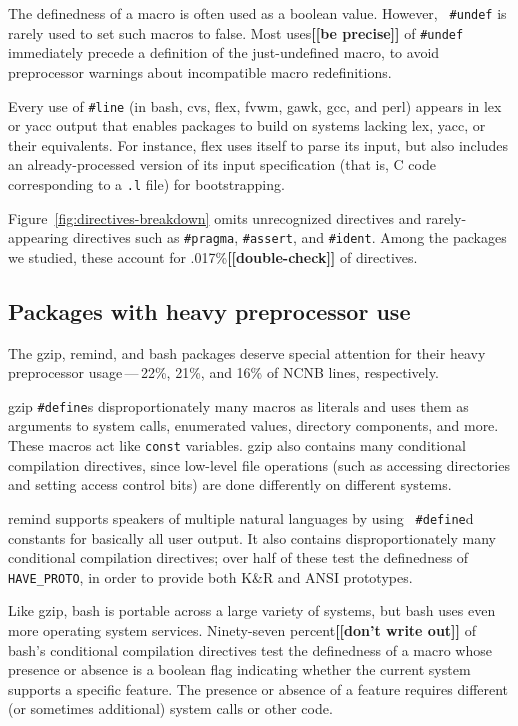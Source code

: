 \documentclass[10pt]{article}
\newcommand{\comment}[1]{\textbf{[[#1]]}}
\newcommand{\pkg}[1]{\textsf{#1}}
\begin{document}
The definedness of a macro is often used as a boolean value.  However, {\tt
\#undef} is rarely used to set such macros to false.  Most
uses\comment{be precise} of {\tt \#undef} immediately precede a definition
of the just-undefined macro, to avoid preprocessor warnings about
incompatible macro redefinitions.

Every use of {\tt \#line} (in \pkg{bash}, \pkg{cvs}, \pkg{flex}, \pkg{fvwm},
\pkg{gawk}, \pkg{gcc}, and \pkg{perl}) appears in lex or yacc
output that enables packages to build on systems lacking lex, yacc, or
their equivalents.  For instance, \pkg{flex} uses itself to parse its
input, but also includes an already-processed version of its input
specification (that is, C code corresponding to a {\tt .l} file) for
bootstrapping.


Figure~\ref{fig:directives-breakdown} omits unrecognized directives and
rarely-appearing directives such as {\tt \#pragma}, {\tt \#assert}, and
{\tt \#ident}.  Among the packages we studied, these account for
.017\%\comment{double-check} of directives.


\subsection{Packages with heavy preprocessor use}

The \pkg{gzip}, \pkg{remind}, and \pkg{bash} packages deserve
special attention for their heavy preprocessor usage\,---\,22\%, 21\%, and
16\% of NCNB lines, respectively.

\pkg{gzip} {\tt \#define}s disproportionately many macros as literals and
uses them as arguments to system calls, enumerated values, directory
components, and more.  These macros act like {\tt const} variables.
\pkg{gzip} also contains many conditional compilation directives, since
low-level file operations (such as accessing directories and setting access
control bits) are done differently on different systems.

\pkg{remind} supports speakers of multiple natural languages by using {\tt
\#define}d constants for basically all user output.  It also contains
disproportionately many conditional compilation directives; over half of
these test the definedness of \verb|HAVE_PROTO|, in order to provide both
K\&R and ANSI prototypes.

Like \pkg{gzip}, \pkg{bash} is portable across a large variety of
systems, but \pkg{bash} uses even more operating system services.
Ninety-seven percent\comment{don't write out} of \pkg{bash}'s conditional compilation directives
test the definedness of a macro whose presence or absence is a boolean
flag indicating whether the current system supports a specific feature.
The presence or absence of a feature requires different (or sometimes
additional) system calls or other code.
\end{document}
